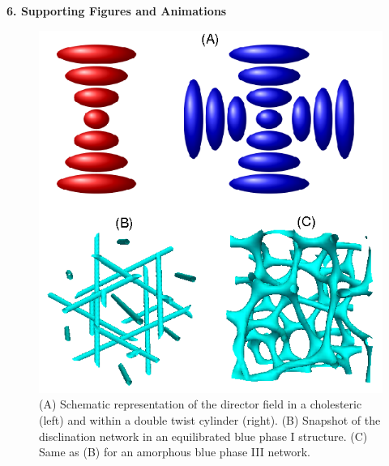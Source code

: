 \documentclass[12pt,twoside]{article}
\begin{document}

{\bf 6. Supporting Figures and Animations}

\begin{figure}
\begin{center}
\includegraphics[scale=0.8]{SupplFig1.png}
\end{center}
\caption{(A) Schematic representation of the director field
in a cholesteric (left) and within a double twist cylinder (right).
(B) Snapshot of the disclination network in an equilibrated 
blue phase I structure. (C) Same as (B) for an amorphous blue phase III
network.}
\end{figure}
\end{document}
